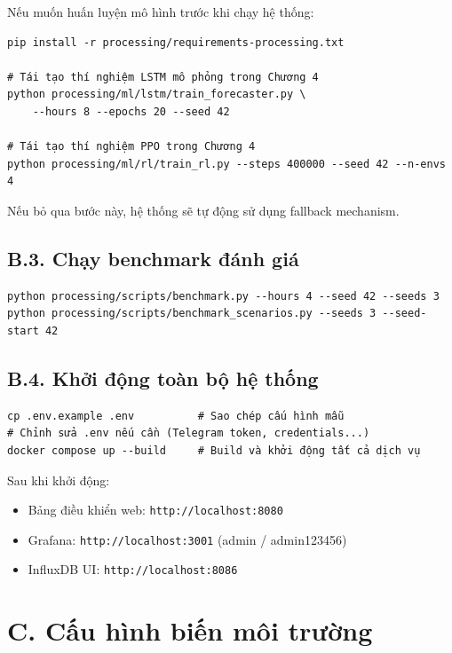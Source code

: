 Nếu muốn huấn luyện mô hình trước khi chạy hệ thống:

\begin{verbatim}
pip install -r processing/requirements-processing.txt

# Tái tạo thí nghiệm LSTM mô phỏng trong Chương 4
python processing/ml/lstm/train_forecaster.py \
    --hours 8 --epochs 20 --seed 42

# Tái tạo thí nghiệm PPO trong Chương 4
python processing/ml/rl/train_rl.py --steps 400000 --seed 42 --n-envs 4
\end{verbatim}

Nếu bỏ qua bước này, hệ thống sẽ tự động sử dụng fallback mechanism.

\subsection*{B.3. Chạy benchmark đánh giá}

\begin{verbatim}
python processing/scripts/benchmark.py --hours 4 --seed 42 --seeds 3
python processing/scripts/benchmark_scenarios.py --seeds 3 --seed-start 42
\end{verbatim}

\subsection*{B.4. Khởi động toàn bộ hệ thống}

\begin{verbatim}
cp .env.example .env          # Sao chép cấu hình mẫu
# Chỉnh sửa .env nếu cần (Telegram token, credentials...)
docker compose up --build     # Build và khởi động tất cả dịch vụ
\end{verbatim}

Sau khi khởi động:
\begin{itemize}
  \item Bảng điều khiển web: \texttt{http://localhost:8080}
  \item Grafana: \texttt{http://localhost:3001} (admin / admin123456)
  \item InfluxDB UI: \texttt{http://localhost:8086}
\end{itemize}

\section*{C. Cấu hình biến môi trường}

